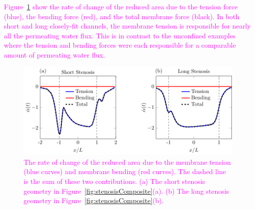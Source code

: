 \documentclass[prb,preprint,showpacs,preprintnumbers,amsmath,amssymb,longbibliography]{revtex4-1}
\newif\ifTikz
\begin{document}
\textcolor{magenta}{
Figure~\ref{fig:stenosisRAdecomp} show
the rate of change of the reduced area due to the tension force
(blue), the bending force (red), and the total membrane force (black).
In both short and long closely-fit channels, the membrane tension is
responsible for nearly all the permeating water flux. This is in contrast to
the unconfined examples where the tension and bending forces were
each responsible for a comparable amount of permeating water flux.}

\begin{figure}[htp]
  \ifTikz
  
  \else
  \includegraphics{figures/stenosisRAdecomp.pdf}
  \fi
  \caption{\label{fig:stenosisRAdecomp} \textcolor{magenta}{The rate of
  change of the reduced area due to the membrane tension (blue curves)
  and membrane bending (red curves). The dashed line is the sum of these
  two contributions. (a) The short stenosis geometry in
  Figure~\ref{fig:stenosisComposite}(a). (b) The long stenosis geometry
  in Figure~\ref{fig:stenosisComposite}(b).}}
\end{figure}


\end{document}
